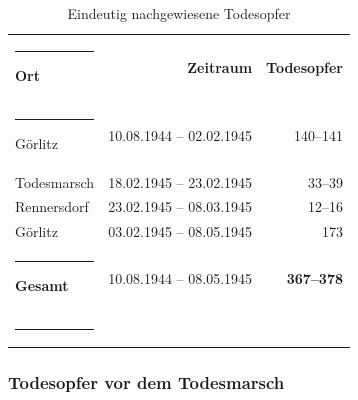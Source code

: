 \documentclass[a4paper,12pt,ngerman,
]{nisebook}
\begin{document}
\begin{table}
\label{opferzahlentab}
\centering
\begin{tabularx}{.8\textwidth}{Lrr}
\hrule
{\bf Ort} & {\bf Zeitraum} & {\bf Todesopfer} \\
\hrule
Görlitz & 10.08.1944 -- 02.02.1945 & 140--141\\
Todesmarsch & 18.02.1945 -- 23.02.1945 & 33--39\\
Rennersdorf & 23.02.1945 -- 08.03.1945 & 12--16\\
Görlitz & 03.02.1945 -- 08.05.1945 & 173\\
\hrule
{\bf Gesamt} & 10.08.1944 -- 08.05.1945	& {\bf 367--378}\\[0pt]
\hrule
\end{tabularx}
\caption{Eindeutig nachgewiesene Todesopfer}
\end{table}


\subsubsection{Todesopfer vor dem Todesmarsch}
\end{document}

